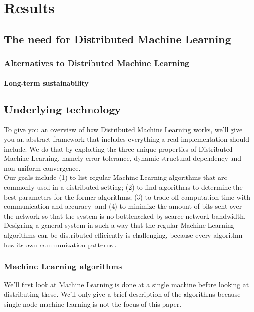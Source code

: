 \section{Results}

\subsection{The need for Distributed Machine Learning}
\subsubsection{Alternatives to Distributed Machine Learning}
\paragraph{Long-term sustainability}










\subsection{Underlying technology}
To give you an overview of how Distributed Machine Learning works, we'll give you an abstract framework that includes everything a real implementation should include. We do that by exploiting the three unique properties of Distributed Machine Learning, namely error tolerance, dynamic structural dependency and non-uniform convergence.\cite{Xing16}\\
Our goals include (1) to list regular Machine Learning algorithms that are commonly used in a distributed setting; (2) to find algorithms to determine the best parameters for the former algorithms; (3) to trade-off computation time with communication and accuracy; and (4) to minimize the amount of bits sent over the network so that the system is no bottlenecked by scarce network bandwidth.\\
Designing a general system in such a way that the regular Machine Learning algorithms can be distributed efficiently is challenging, because every algorithm has its own communication patterns \cite{Jia14}\cite{Newman09}\cite{Rich13}\cite{Smola10}\cite{Takac13}\cite{Tsi12}.


\subsubsection{Machine Learning algorithms}
We'll first look at Machine Learning is done at a single machine before looking at distributing these. We'll only give a brief description of the algorithms because single-node machine learning is not the focus of this paper.


